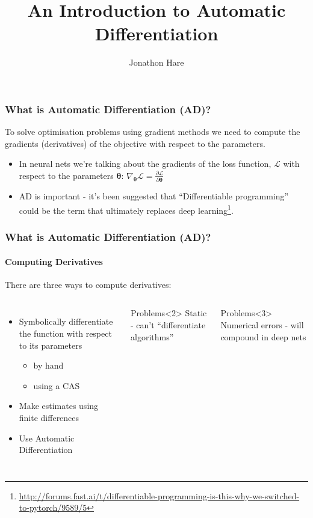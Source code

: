 \documentclass[\beamerclass]{beamer}
\title[Automatic Differentiation]{An Introduction to Automatic Differentiation}
\author{Jonathon Hare}
\institute[]
{
  Vision, Learning and Control\\
  University of Southampton 
}
\date{}
\begin{document}

\begin{frame}
\frametitle{What is Automatic Differentiation (AD)?}
To solve optimisation problems using gradient methods we need to compute the gradients (derivatives) of the objective with respect to the parameters.
\begin{itemize}
	\item In neural nets we're talking about the gradients of the loss function, $\mathcal{L}$ with respect to the parameters $\bm{\theta}$: 
	$\nabla_{\bm{\theta}} \mathcal{L} = \frac{\partial \mathcal{L}}{\partial \bm{\theta}}$
	\item AD is important - it's been suggested that ``Differentiable programming'' could be the term that ultimately replaces deep learning\footnote{\url{http://forums.fast.ai/t/differentiable-programming-is-this-why-we-switched-to-pytorch/9589/5}}.
\end{itemize}
\end{frame}

\begin{frame}
	\frametitle{What is Automatic Differentiation (AD)?}
	\framesubtitle{Computing Derivatives}
There are three ways to compute derivatives:

\begin{columns}
    \begin{itemize}
    	\item<1,2> Symbolically differentiate the function with respect to its parameters
    	\begin{itemize}
    		\item by hand
    		\item using a CAS
    	\end{itemize}
    	\item<1,3> Make estimates using finite differences
    	\item<1,4> Use Automatic Differentiation
    \end{itemize}

      \begin{block}{Problems}<2>
        Static - can't ``differentiate algorithms''
      \end{block}
      \begin{block}{Problems}<3>
        Numerical errors - will compound in deep nets
      \end{block}
  \end{columns}
\end{frame}
\end{document}

